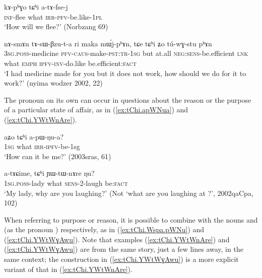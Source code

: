    \begin{exe}
\ex \label{ex:tChi.atAfsej}
\gll  kɤ-pʰɣo tɕʰi a-tɤ-fse-j    \\
\textsc{inf}-flee what \textsc{irr-pfv}-be.like-\textsc{1pl} \\
\glt  `How will we flee?' (Norbzang 69)
\end{exe} 

\begin{exe}
\ex \label{ex:tChi.Zo.tuwGBzu}
\gll nɤ-smɤn tɤ-sɯ-βzu-t-a ri maka mɯ́j-pʰɤn, tɕe tɕʰi ʑo tú-wɣ-stu pʰɤn \\
\textsc{3sg.poss}-medicine \textsc{pfv-caus}-make-\textsc{pst:tr-1sg} but at.all \textsc{neg:sens}-be.efficient \textsc{lnk} what \textsc{emph} \textsc{ipfv-inv}-do.like be.efficient:\textsc{fact} \\
\glt `I had medicine made for you but it does not work, how should we do for it to work?' (nyima wodzer 2002, 22) 
\end{exe}  

 
The pronoun  on its own can occur in questions about the reason or the purpose of a particular state of affair, as in (\ref{ex:tChi.apWNua}) and (\ref{ex:tChi.YWtWnAre}).

\begin{exe}
\ex \label{ex:tChi.apWNua}
\gll  aʑo tɕʰi a-pɯ-ŋu-a? \\
\textsc{1sg} what \textsc{irr-ipfv}-be-1sg \\
\glt `How can it be me?' (2003sras, 61)
\end{exe}  

\begin{exe}
\ex \label{ex:tChi.YWtWnAre}
\gll  a-tɤɕime, tɕʰi ɲɯ-tɯ-nɤre ŋu? \\
 \textsc{1sg.poss}-lady what \textsc{sens}-2-laugh be:\textsc{fact} \\
 \glt `My lady, why are you laughing?'  (Not `what are you laughing at ?', 2002qaCpa, 102)
\end{exe}  

When referring to purpose or reason, it is possible to combine   with the nouns  and  (as the pronoun )  respectively, as in (\ref{ex:tChi.Wspa.pWNu}) and (\ref{ex:tChi.YWtWɣAwu}). Note that examples (\ref{ex:tChi.YWtWnAre}) and (\ref{ex:tChi.YWtWɣAwu}) are from the same story, just a few lines away, in the same context; the construction in (\ref{ex:tChi.YWtWɣAwu}) is a more explicit variant of that in (\ref{ex:tChi.YWtWnAre}).

